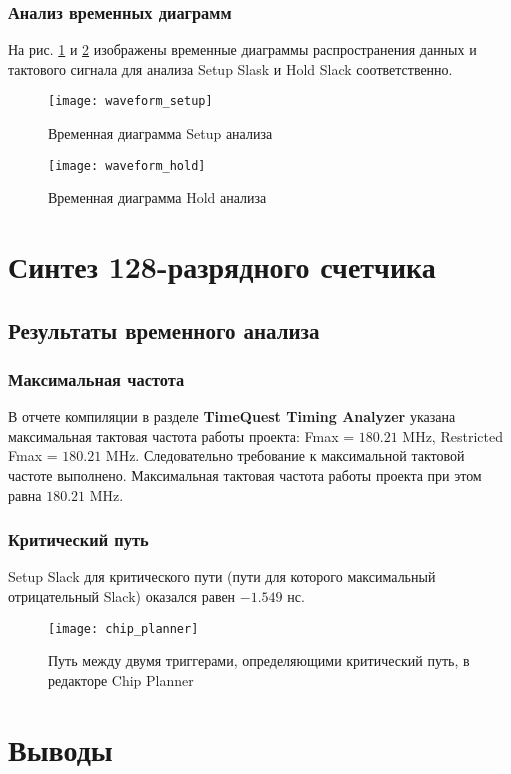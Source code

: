\subsubsection{Анализ временных диаграмм}

На рис. \ref{fig:waveform_setup} и \ref{fig:waveform_hold} изображены временные диаграммы распространения данных и тактового сигнала для анализа Setup Slask и Hold Slack соответственно.

\begin{figure}[H]
\begin{center}
	\texttt{[image: waveform\_setup]}
	\caption{Временная диаграмма Setup анализа}
	\label{fig:waveform_setup}
\end{center}
\end{figure}

\vspace{-1.5cm}
\begin{figure}[H]
\begin{center}
	\texttt{[image: waveform\_hold]}
	\caption{Временная диаграмма Hold анализа}
	\label{fig:waveform_hold}
\end{center}
\end{figure}

\section{Синтез 128-разрядного счетчика}

\subsection{Результаты временного анализа}

\subsubsection{Максимальная частота}

В отчете компиляции в разделе \textbf{TimeQuest Timing Analyzer} указана максимальная тактовая частота работы проекта: Fmax = $180.21$ MHz, Restricted Fmax = $180.21$ MHz. Следовательно требование к максимальной тактовой частоте выполнено. Максимальная тактовая частота работы проекта при этом равна $180.21$ MHz. 

\subsubsection{Критический путь}

Setup Slack для критического пути (пути для которого максимальный отрицательный Slack) оказался равен $-1.549$ нс.

\begin{figure}[H]
\begin{center}
	\texttt{[image: chip\_planner]}
	\caption{Путь между двумя триггерами, определяющими критический путь, в редакторе Chip Planner}
	\label{fig:chip_planner}
\end{center}
\end{figure}

\section{Выводы}

